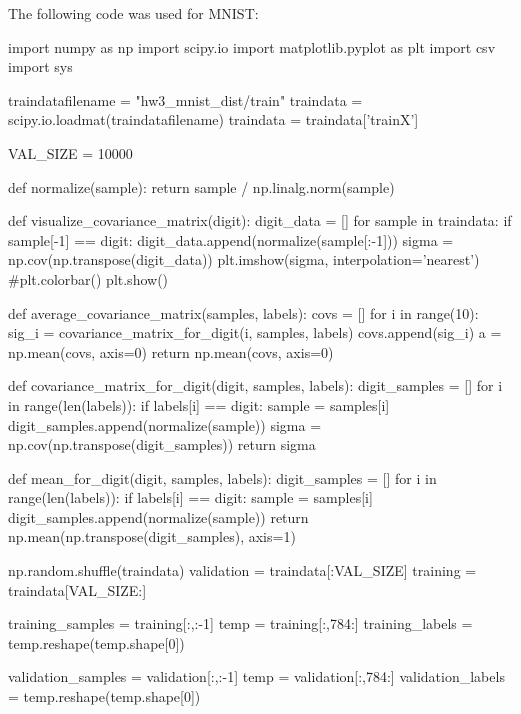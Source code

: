 \documentclass{article}
\begin{document}
The following code was used for MNIST:
\begin{python}
import numpy as np
import scipy.io
import matplotlib.pyplot as plt
import csv
import sys

traindatafilename = "hw3_mnist_dist/train"
traindata = scipy.io.loadmat(traindatafilename)
traindata = traindata['trainX']

VAL_SIZE = 10000

def normalize(sample):
    return sample / np.linalg.norm(sample)

def visualize_covariance_matrix(digit):
    digit_data = []
    for sample in traindata:
        if sample[-1] == digit:
            digit_data.append(normalize(sample[:-1]))
    sigma = np.cov(np.transpose(digit_data))
    plt.imshow(sigma, interpolation='nearest')
    #plt.colorbar()
    plt.show()

def average_covariance_matrix(samples, labels):
    covs = []
    for i in range(10):
        sig_i = covariance_matrix_for_digit(i, samples, labels)
        covs.append(sig_i)
    a = np.mean(covs, axis=0)
    return np.mean(covs, axis=0)

def covariance_matrix_for_digit(digit, samples, labels):
    digit_samples = []
    for i in range(len(labels)):
        if labels[i] == digit:
            sample = samples[i]
            digit_samples.append(normalize(sample))
    sigma = np.cov(np.transpose(digit_samples))
    return sigma

def mean_for_digit(digit, samples, labels):
    digit_samples = []
    for i in range(len(labels)):
        if labels[i] == digit:
            sample = samples[i]
            digit_samples.append(normalize(sample))
    return np.mean(np.transpose(digit_samples), axis=1)

np.random.shuffle(traindata)
validation = traindata[:VAL_SIZE]
training = traindata[VAL_SIZE:]

training_samples = training[:,:-1]
temp = training[:,784:]
training_labels = temp.reshape(temp.shape[0])

validation_samples = validation[:,:-1]
temp = validation[:,784:]
validation_labels = temp.reshape(temp.shape[0])


\end{python}
\end{document}
